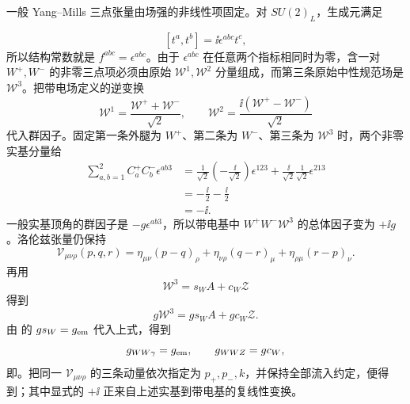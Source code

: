 \begin{derivation}
一般 Yang--Mills 三点张量由场强的非线性项固定。对 $SU(2)_L$，生成元满足

\[
 [t^a,t^b]=\ii\epsilon^{abc}t^c,
\]
所以结构常数就是 $f^{abc}=\epsilon^{abc}$。由于 $\epsilon^{abc}$ 在任意两个指标相同时为零，含一对 $W^+,W^-$ 的非零三点项必须由原始 $\mathcal W^1,\mathcal W^2$ 分量组成，而第三条原始中性规范场是 $\mathcal W^3$。把带电场定义的逆变换
\begin{equation*}
 \mathcal W^1=\frac{\mathcal W^++\mathcal W^-}{\sqrt2},
 \qquad
 \mathcal W^2=\frac{\ii(\mathcal W^+-\mathcal W^-)}{\sqrt2}
\end{equation*}
代入群因子。固定第一条外腿为 $W^+$、第二条为 $W^-$、第三条为 $\mathcal W^3$ 时，两个非零实基分量给
\begin{align*}
 \sum_{a,b=1}^{2}C_a^+C_b^-\epsilon^{ab3}
 &=\frac1{\sqrt2}\left(-\frac{\ii}{\sqrt2}\right)\epsilon^{123}
 +\frac{\ii}{\sqrt2}\frac1{\sqrt2}\epsilon^{213}\\
 &=-\frac{\ii}{2}-\frac{\ii}{2}\\
 &=-\ii.
\end{align*}
一般实基顶角的群因子是 $-g\epsilon^{ab3}$，所以带电基中 $W^+W^-\mathcal W^3$ 的总体因子变为 $+\ii g$。洛伦兹张量仍保持
\begin{equation*}
 \mathcal V_{\mu\nu\rho}(p,q,r)
 =\eta_{\mu\nu}(p-q)_\rho
 +\eta_{\nu\rho}(q-r)_\mu
 +\eta_{\rho\mu}(r-p)_\nu.
\end{equation*}
再用
\begin{equation*}
 \mathcal W^3=s_WA+c_W\mathcal Z
\end{equation*}
得到
\begin{equation*}
 g\mathcal W^3=gs_WA+gc_W\mathcal Z.
\end{equation*}
由 的 $gs_W=g_{\rm em}$ 代入上式，得到
\begin{equation*}
 g_{WW\gamma}=g_{\rm em},
 \qquad
 g_{WWZ}=gc_W,
\end{equation*}
即。把同一 $\mathcal V_{\mu\nu\rho}$ 的三条动量依次指定为 $p_+,p_-,k$，并保持全部流入约定，便得到；其中显式的 $+\ii$ 正来自上述实基到带电基的复线性变换。
\end{derivation}

